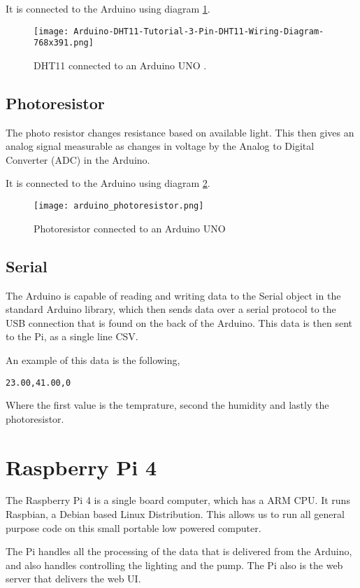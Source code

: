 \documentclass[a4paper,12pt,twoside,openright,titlepage]{book}
\begin{document}
It is connected to the Arduino using diagram \ref{diagram1}.

\begin{figure}[h]
    \texttt{[image: Arduino-DHT11-Tutorial-3-Pin-DHT11-Wiring-Diagram-768x391.png]}
    \caption{DHT11 connected to an Arduino UNO \cite{dht}.}
    \label{diagram1}
\end{figure}

\subsection{Photoresistor}
The photo resistor changes resistance based on available light.
This then gives an analog signal measurable as changes in voltage by the Analog to Digital Converter (ADC) in the Arduino.

It is connected to the Arduino using diagram \ref{diagram2}.

\begin{figure}[h]
    \texttt{[image: arduino\_photoresistor.png]}
    \caption{Photoresistor connected to an Arduino UNO \cite{photoresistor_arduino}}
    \label{diagram2}
\end{figure}

\subsection{Serial}
The Arduino is capable of reading and writing data to the Serial object in the standard Arduino library, which then sends data over a serial protocol to the USB connection that is found on the back of the Arduino.
This data is then sent to the Pi, as a single line CSV.

An example of this data is the following,
\begin{verbatim}
23.00,41.00,0
\end{verbatim}

Where the first value is the temprature, second the humidity and lastly the photoresistor.

\section{Raspberry Pi 4}
The Raspberry Pi 4 is a single board computer, which has a ARM CPU.
It runs Raspbian, a Debian based Linux Distribution.
This allows us to run all general purpose code on this small portable low powered computer.

The Pi handles all the processing of the data that is delivered from the Arduino, and also handles controlling the lighting and the pump.
The Pi also is the web server that delivers the web UI.
\end{document}
